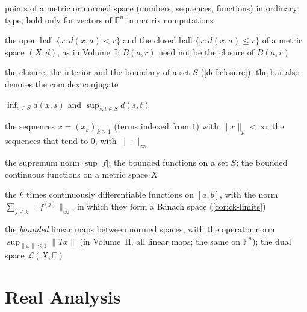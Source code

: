 \documentclass{sdbook-eng}
\begin{document}
\begin{symbols}
\item[$x$, $f$; $\mathbf x$] points of a metric or normed space (numbers, sequences, functions) in ordinary type; bold only for vectors of $\mathbb F^n$ in matrix computations
\item[$B(a,r)$, $\bar B(a,r)$] the open ball $\{x: d(x,a)<r\}$ and the closed ball $\{x: d(x,a)\le r\}$ of a metric space $(X,d)$, as in Volume~I; $\bar B(a,r)$ need not be the closure of $B(a,r)$
\item[$\overline S$, $\operatorname{int}S$, $\partial S$] the closure, the interior and the boundary of a set $S$ (\cref{def:closure}); the bar also denotes the complex conjugate
\item[$\operatorname{dist}(x,S)$, $\operatorname{diam}S$] $\inf_{s\in S}d(x,s)$ and $\sup_{s,t\in S}d(s,t)$
\item[$\ell^p$, $c_0$] the sequences $x=(x_k)_{k\ge1}$ (terms indexed from $1$) with $\|x\|_p<\infty$; the sequences that tend to $0$, with $\|\cdot\|_\infty$
\item[$\|f\|_\infty$, $\ell^\infty(S)$, $C_b(X)$] the supremum norm $\sup|f|$; the bounded functions on a set $S$; the bounded continuous functions on a metric space $X$
\item[{$C^k[a,b]$, $\|f\|_{C^k}$}] the $k$ times continuously differentiable functions on $[a,b]$, with the norm $\sum_{j\le k}\|f^{(j)}\|_\infty$, in which they form a Banach space (\cref{cor:ck-limits})
\item[$\mathcal L(X,Y)$, $\|T\|$, $X^*$] the \emph{bounded} linear maps between normed spaces, with the operator norm $\sup_{\|x\|\le1}\|Tx\|$ (in Volume~II, all linear maps; the same on $\mathbb F^n$); the dual space $\mathcal L(X,\mathbb F)$
\end{symbols}

\mainmatter
\part{Real Analysis}





\backmatter
\end{document}
